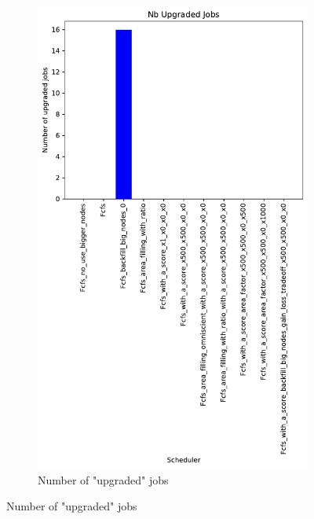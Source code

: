 \documentclass[a4paper]{article}
\begin{document}
\begin{figure}[H]
\begin{subfigure}[b]{0.4\linewidth}\centering\includegraphics[width=0.7\linewidth]{MBSS/plot/Results_Size_And_Data_2022-03-01->2022-03-03_V85105_Nb_Upgraded_Jobs_450_128_32_256_4_1024.pdf}\caption{Number of "upgraded" jobs}\label{45}\end{subfigure}

\end{figure}
\end{document}
